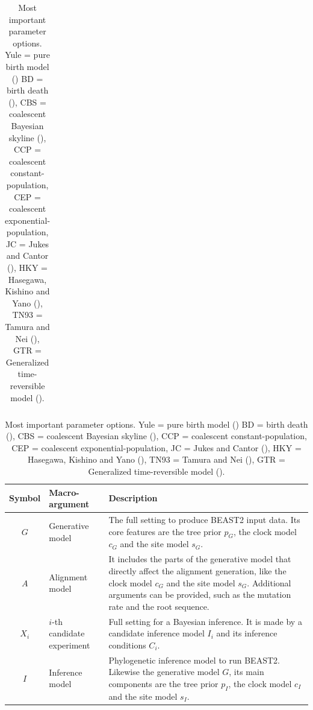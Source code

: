 \documentclass{article}
\begin{document}
\begin{table}
\begin{tabular}{|p{3.2cm}|p{9.7cm}|p{4.5cm}@{}|}
    \hline
  \end{tabular}
  \caption{
    Most important parameter options.
    Yule = pure birth model (\cite{yule})
    BD = birth death (\cite{nee1994reconstructed}), 
    CBS = coalescent Bayesian skyline (\cite{drummond2005bayesian}), 
    CCP = coalescent constant-population, 
    CEP = coalescent exponential-population,
    JC = Jukes and Cantor (\cite{jukes1969evolution}), 
    HKY = Hasegawa, Kishino and Yano (\cite{hasegawa1985dating}), 
    TN93 = Tamura and Nei (\cite{tamura1993estimation}), 
    GTR = Generalized time-reversible model (\cite{tavare1986some}).
  }
  \label{tab:options}
\bigskip

  \begin{tabular}{|@{}c|p{4cm}|p{12cm}|}
    \hline
    \centering
    \textbf{Symbol} &
    \textbf{Macro-argument} &
    \textbf{Description} \\
    \hline
    $\mathit{G}$ &
    Generative model &
    The full setting to produce BEAST2 input data. 
    Its core features are the tree prior $\mathit{p_{G}}$, the clock 
    model $\mathit{c_{G}}$ and the site model $\mathit{s_{G}}$. \\
    $\mathit{A}$ &
    Alignment model &
    It includes the parts of the generative model that directly affect the 
    alignment generation, like the clock model $\mathit{c_{G}}$ and 
    the site model $\mathit{s_{G}}$. Additional arguments can be provided, 
    such as the mutation rate and the root sequence. \\
    $\mathit{X_{i}}$ &
    $i$-th candidate experiment &
    Full setting for a Bayesian inference. It is made by a 
    candidate inference model $\mathit{I_{i}}$ and its 
    inference conditions $\mathit{C_{i}}$. \\
    $\mathit{I}$ &
    Inference model &
    Phylogenetic inference model to run BEAST2. Likewise the generative model $G$, 
    its main components are the tree prior $\mathit{p_{I}}$, the 
    clock model $\mathit{c_{I}}$ and the site model $\mathit{s_{I}}$. \\

\end{tabular}
\end{table}
\end{document}
